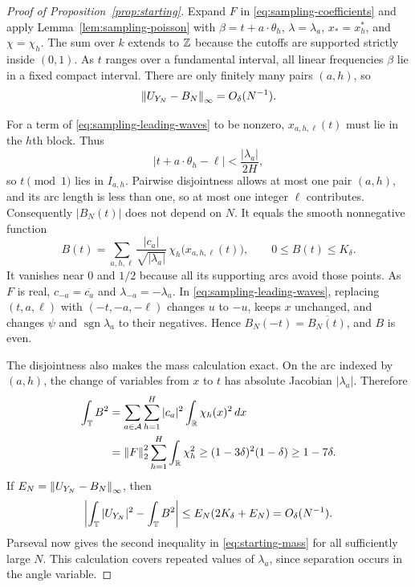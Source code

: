 \begin{proof}[Proof of Proposition~\ref{prop:starting}]
Expand $F$ in \eqref{eq:sampling-coefficients} and apply
Lemma~\ref{lem:sampling-poisson} with
$\beta=t+a\cdot\theta_h$, $\lambda=\lambda_a$, $x_*=x_h^*$,
and $\chi=\chi_h$.  The sum over $k$ extends to $\mathbb Z$ because the
cutoffs are supported strictly inside $(0,1)$.  As $t$ ranges over a
fundamental interval, all linear frequencies $\beta$ lie in a fixed
compact interval.  There are only finitely many pairs $(a,h)$, so
\begin{equation}
 \label{eq:sampling-uniform-approximation}
 \left\lVert U_{Y_N}-B_N\right\rVert_\infty=O_\delta(N^{-1}).
\end{equation}

For a term of \eqref{eq:sampling-leading-waves} to be nonzero,
$x_{a,h,\ell}(t)$ must lie in the $h$th block.  Thus
\[
 |t+a\cdot\theta_h-\ell|<\frac{|\lambda_a|}{2H},
\]
so $t\pmod1$ lies in $I_{a,h}$.  Pairwise disjointness allows at most
one pair $(a,h)$, and its arc length is less than one, so at most one
integer $\ell$ contributes.  Consequently $|B_N(t)|$ does not depend
on $N$.  It equals the smooth nonnegative function
\begin{equation}
 \label{eq:sampling-modulus}
 B(t)=\sum_{a,h,\ell}
 \frac{|c_a|}{\sqrt{|\lambda_a|}}\,
                 \chi_h\bigl(x_{a,h,\ell}(t)\bigr),
 \qquad 0\le B(t)\le K_\delta.
\end{equation}
It vanishes near $0$ and $1/2$ because all its supporting arcs avoid
those points.  As $F$ is real, $c_{-a}=\overline{c_a}$ and
$\lambda_{-a}=-\lambda_a$.  In
\eqref{eq:sampling-leading-waves}, replacing $(t,a,\ell)$ with
$(-t,-a,-\ell)$ changes $u$ to $-u$, keeps $x$ unchanged, and changes
$\psi$ and $\operatorname{sgn}\lambda_a$ to their negatives.  Hence
$B_N(-t)=\overline{B_N(t)}$, and $B$ is even.

The disjointness also makes the mass calculation exact.  On the arc
indexed by $(a,h)$, the change of variables from $x$ to $t$ has
absolute Jacobian $|\lambda_a|$.  Therefore
\begin{align}
 \int_\mathbb T B^2
 &=\sum_{a\in\mathcal A}\sum_{h=1}^H
                  |c_a|^2\int_\mathbb R\chi_h(x)^2\,dx
 \notag\\
 &=\left\lVert F\right\rVert_2^2\sum_{h=1}^H\int_\mathbb R\chi_h^2
 \ge(1-3\delta)^2(1-\delta)\ge1-7\delta.
 \label{eq:sampling-mass-identity}
\end{align}
If $E_N=\left\lVert U_{Y_N}-B_N\right\rVert_\infty$, then
\[
 \left|\int_\mathbb T|U_{Y_N}|^2-\int_\mathbb T B^2\right|
 \le E_N(2K_\delta+E_N)=O_\delta(N^{-1}).
\]
Parseval now gives the second inequality in \eqref{eq:starting-mass}
for all sufficiently large $N$.  This calculation covers repeated
values of $\lambda_a$, since separation occurs in the angle variable.


\end{proof}
